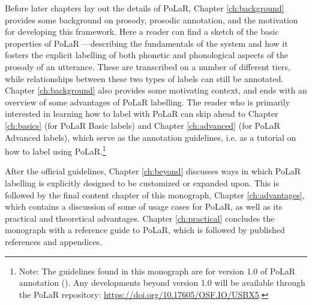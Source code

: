 \documentclass[11pt, twoside]{memoir}
\begin{document}
Before later chapters lay out the details of PoLaR, Chapter \ref{ch:background} provides some background on prosody, prosodic annotation, and the motivation for developing this framework. Here a reader can find a sketch of the basic properties of PoLaR —describing the fundamentals of the system and how it fosters the explicit labelling of both phonetic and phonological aspects of the prosody of an utterance.  These are transcribed on a number of different tiers, while relationships between these two types of labels can still be annotated. Chapter \ref{ch:background} also provides some motivating context, and ends with an overview of some advantages of PoLaR labelling. The reader who is primarily interested in learning how to label with PoLaR can skip ahead to Chapter \ref{ch:basics} (for PoLaR Basic labels) and Chapter \ref{ch:advanced} (for PoLaR Advanced labels), which serve as the annotation guidelines, i.e. as a tutorial on how to label using PoLaR.\footnote{Note: The guidelines found in this monograph are for version 1.0 of PoLaR annotation (\citealt{ahn-21}). Any developments beyond version 1.0 will be available through the PoLaR repository: \href{https://doi.org/10.17605/OSF.IO/USBX5}{https://doi.org/10.17605/OSF.IO/USBX5}.}

After the official guidelines, Chapter \ref{ch:beyond} discusses ways in which PoLaR labelling is explicitly designed to be customized or expanded upon. This is followed by the final content chapter of this monograph, Chapter \ref{ch:advantages}, which contains a discussion of some of usage cases for PoLaR, as well as its practical and theoretical advantages. Chapter \ref{ch:practical} concludes the monograph with a reference guide to PoLaR, which is followed by published references and appendices.

\renewcommand*{\thefootnote}{\arabic{footnote}}


\appendix
\end{document}

